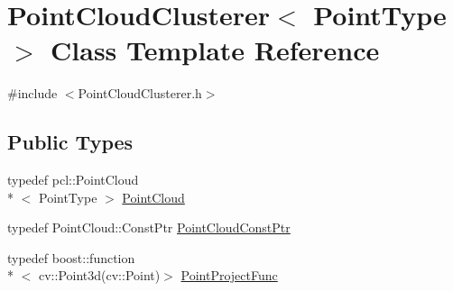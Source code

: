 \hypertarget{classPointCloudClusterer}{\section{Point\-Cloud\-Clusterer$<$ Point\-Type $>$ Class Template Reference}
\label{classPointCloudClusterer}
}


{\ttfamily \#include $<$Point\-Cloud\-Clusterer.\-h$>$}

\subsection*{Public Types}
\begin{DoxyCompactItemize}
\item 
typedef pcl\-::\-Point\-Cloud\\*
$<$ Point\-Type $>$ \hyperlink{classPointCloudClusterer_aeac82c7494ccf2580112ef55d7e30b39}{Point\-Cloud}
\item 
typedef Point\-Cloud\-::\-Const\-Ptr \hyperlink{classPointCloudClusterer_a042579611b15a7ae275603b624df3968}{Point\-Cloud\-Const\-Ptr}
\item 
typedef boost\-::function\\*
$<$ cv\-::\-Point3d(cv\-::\-Point)$>$ \hyperlink{classPointCloudClusterer_adc13c5f02a2a888f33eedbc33188f202}{Point\-Project\-Func}
\end{DoxyCompactItemize}
